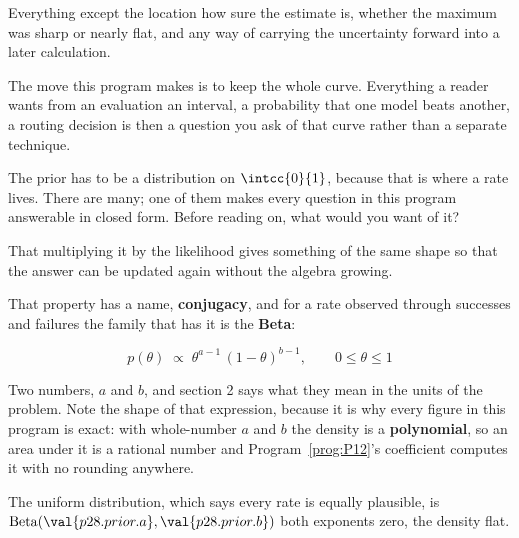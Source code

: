\begin{fr}
\begin{ansblock}
Everything except the location \dash{} how sure the estimate is, whether the
maximum was sharp or nearly flat, and any way of carrying the uncertainty
forward into a later calculation.
\end{ansblock}


The move this program makes is to keep the whole curve. Everything a reader
wants from an evaluation \dash{} an interval, a probability that one model
beats another, a routing decision \dash{} is then a question you ask of that
curve rather than a separate technique.

The prior has to be a distribution on $\intcc{0}{1}$, because that is where a
rate lives. There are many; one of them makes every question in this program
answerable in closed form. Before reading on, what would you want of it?
\dotline
\nextframe
\end{fr}

\begin{fr}
\begin{ansblock}
That multiplying it by the likelihood gives something of the same shape
\dash{} so that the answer can be updated again without the algebra growing.
\end{ansblock}

That property has a name, \textbf{conjugacy}, and for a rate
observed through successes and failures the family that has it is the
\textbf{Beta}:

\[ p(\theta) \;\propto\; \theta^{a-1}\,(1-\theta)^{b-1},
   \qquad 0 \le \theta \le 1 \]

Two numbers, $a$ and $b$, and section 2 says what they mean in the units of
the problem. Note the shape of that expression, because it is why every figure
in this program is exact: with whole-number $a$ and $b$ the density is a
\textbf{polynomial}, so an area under it is a rational number and
Program~\ref{prog:P12}'s coefficient computes it with no rounding anywhere.

The uniform distribution, which says every rate is equally plausible, is
$\mathrm{Beta}(\val{p28.prior.a}, \val{p28.prior.b})$ \dash{} both exponents
zero, the density flat.
\end{fr}

